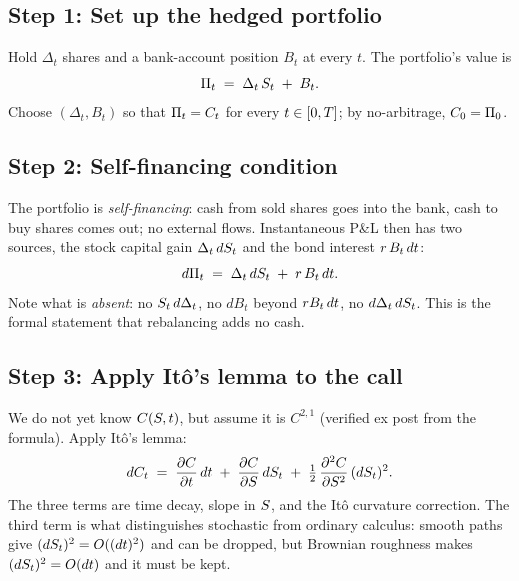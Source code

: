 \subsection{Step 1: Set up the hedged portfolio}
\label{subsec:ch15_pde_step1}

Hold $\Delta_t$ shares and a bank-account position $B_t$ at
every $t$. The portfolio's value is
\begin{equation}
  \Pi_t \;=\; \Delta_t\,S_t \;+\; B_t.
  \label{eq:portfolio_value}
\end{equation}
Choose $(\Delta_t, B_t)$ so that $\Pi_t = C_t$ for every
$t \in [0, T]$; by no-arbitrage, $C_0 = \Pi_0$.

\subsection{Step 2: Self-financing condition}
\label{subsec:ch15_pde_step2}

The portfolio is \emph{self-financing}: cash from sold shares
goes into the bank, cash to buy shares comes out; no external
flows. Instantaneous P\&L then has two sources, the stock
capital gain $\Delta_t\, dS_t$ and the bond interest
$r\, B_t\, dt$:
\begin{equation}
  d\Pi_t \;=\; \Delta_t\,dS_t \;+\; r\,B_t\,dt.
  \label{eq:self_financing}
\end{equation}
Note what is \emph{absent}: no $S_t\,d\Delta_t$, no $dB_t$
beyond $r B_t\,dt$, no $d\Delta_t\,dS_t$. This is the
formal statement that rebalancing adds no cash.

\subsection{Step 3: Apply It\^o's lemma to the call}
\label{subsec:ch15_pde_step3}

We do not yet know $C(S, t)$, but assume it is $C^{2,1}$
(verified ex post from the formula). Apply It\^o's lemma:
\begin{equation}
  dC_t
  \;=\; \frac{\partial C}{\partial t}\,dt
     \;+\; \frac{\partial C}{\partial S}\,dS_t
     \;+\; \tfrac{1}{2}\,\frac{\partial^2 C}{\partial S^2}\,
           (dS_t)^2.
  \label{eq:ito_C}
\end{equation}
The three terms are time decay, slope in $S$, and the It\^o
curvature correction. The third term is what distinguishes
stochastic from ordinary calculus: smooth paths give
$(dS_t)^2 = O((dt)^2)$ and can be dropped, but Brownian
roughness makes $(dS_t)^2 = O(dt)$ and it must be kept.

